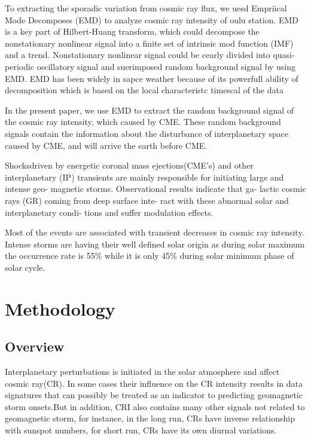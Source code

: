 \documentclass[draft]{agujournal2019}
\begin{document}
To extracting the sporadic variation from cosmic ray flux, we uesd Empriical Mode Decomposes (EMD) to analyze  cosmic ray intensity of oulu station.  EMD is a key part of Hilbert-Huang transform\cite{Huang1998}, which could decompose the nonstationary nonlinear signal into a finite set of intrinsic mod function (IMF) and a trend\cite{Barnhart2011}. Nonstationary nonlinear signal could be cearly divided into quasi-periodic oscillatory signal and suerimposed random background signal by using EMD\cite{Kolotkov2016Empirical}. EMD has been widely in sapce weather because of its powerfull ability of decomposition which is based on the local characteristc timescal of the data\cite{Coughlin200411,Barnhart2011,refId0,Cho_2016,Kolotkov2016Empirical,Stangalini2014,Xiang_2016}

In the present paper, we use EMD to extract the random background signal of  the cosmic ray intensity, which caused by CME.  These random background signals contain the information about the disturbance of interplanetary space caused by CME, and will arrive the earth before CME. 


Shocksdriven by energetic coronal mass ejections(CME’s) and other interplanetary (IP) transients are mainly responsible for initiating large and intense geo- magnetic storms. Observational results indicate that ga- lactic cosmic rays (GR) coming from deep surface inte- ract with these abnormal solar and interplanetary condi- tions and suffer modulation effects.

Most of the events are associated with transient decreases in cosmic ray intensity. Intense storms are having their well defined solar origin as during solar maximum the occurrence rate is 55\% while it is only 45\% during solar minimum phase of solar cycle.

\section{Methodology}

\subsection{Overview}
Interplanetary perturbations is initiated in the solar atmosphere and affect cosmic ray(CR). In some cases their influence on the CR intensity results in data signatures that can possibly be treated as an indicator to predicting geomagnetic storm onsets\cite{Kudela2000}.But in addition, CRI also contains many other signals not related to geomagnetic storm, for instance, in the long run, CRs have inverse relationship with sunspot numbers, for short run, CRs have its own diurnal variations.
\end{document}
